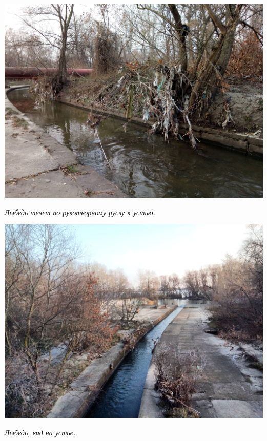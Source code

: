 \begin{center}
\includegraphics[width=0.92\linewidth]{rpix/IMG_20191126_143542.jpg}

\textit{Лыбедь течет по рукотворному руслу к устью.}
\end{center}


\begin{center}
\includegraphics[width=\linewidth]{rpix/IMG_20191126_141033_DRO.jpg}

\textit{Лыбедь, вид на устье.}
\end{center}



